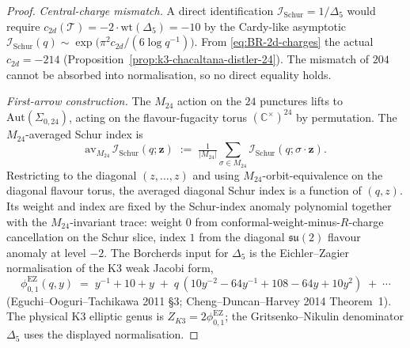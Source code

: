 \begin{proof}
\emph{Central-charge mismatch.} A direct identification
$\mathcal{I}_{\mathrm{Schur}} = 1/\Delta_5$ would require $c_{2d}(\mathcal{T})
= -2\cdot\mathrm{wt}(\Delta_5) = -10$ by the Cardy-like asymptotic
$\mathcal{I}_{\mathrm{Schur}}(q) \sim \exp\bigl(\pi^2 c_{2d}/(6\log q^{-1})\bigr)$.
From \eqref{eq:BR-2d-charges} the actual $c_{2d} = -214$
(Proposition~\ref{prop:k3-chacaltana-distler-24}). The mismatch of
$204$ cannot be absorbed into normalisation, so no direct equality holds.

\emph{First-arrow construction.} The $M_{24}$ action on the $24$ punctures
lifts to $\mathrm{Aut}(\Sigma_{0,24})$, acting on the flavour-fugacity torus
$(\mathbb{C}^\times)^{24}$ by permutation. The $M_{24}$-averaged Schur index
is
\[
 \mathrm{av}_{M_{24}}\,\mathcal{I}_{\mathrm{Schur}}(q;\mathbf{z})
 \;:=\;
 \tfrac{1}{|M_{24}|}\sum_{\sigma\in M_{24}}
 \mathcal{I}_{\mathrm{Schur}}(q;\sigma\cdot\mathbf{z}).
\]
Restricting to the diagonal $(z,\ldots,z)$ and using
$M_{24}$-orbit-equivalence on the diagonal flavour torus, the averaged
diagonal Schur index is a function of $(q,z)$. Its weight and index are
fixed by the Schur-index anomaly polynomial together with the
$M_{24}$-invariant trace: weight $0$ from conformal-weight-minus-$R$-charge
cancellation on the Schur slice, index $1$ from the diagonal
$\mathfrak{su}(2)$ flavour anomaly at level $-2$. The Borcherds input for
\(\Delta_5\) is the Eichler--Zagier normalisation of the K3 weak Jacobi
form,
\[
 \phi_{0,1}^{\mathrm{EZ}}(q,y)
 \;=\;
 y^{-1} + 10 + y
 \;+\; q\,(10y^{-2}-64y^{-1}+108-64y+10y^2)
 \;+\; \cdots
\]
(Eguchi--Ooguri--Tachikawa 2011 \S3; Cheng--Duncan--Harvey 2014 Theorem~1).
The physical K3 elliptic genus is \(Z_{K3}=2\phi_{0,1}^{\mathrm{EZ}}\); the
Gritsenko--Nikulin denominator \(\Delta_5\) uses the displayed
normalisation.


\end{proof}
